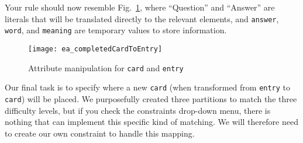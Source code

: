Your rule should now resemble Fig.~\ref{ea:cardtoentry_2}, where ``Question'' and ``Answer'' are literals that will be translated directly to the relevant
elements, and \texttt{answer}, \texttt{word}, and \texttt{meaning} are temporary values to store information.

\vspace{0.5cm}

\begin{figure}[htbp]
\begin{center}
  \texttt{[image: ea\_completedCardToEntry]}
  \caption{Attribute manipulation for \texttt{card} and \texttt{entry}}
  \label{ea:cardtoentry_2}
\end{center}
\end{figure}
\FloatBarrier


Our final task is to specify where a new \texttt{card} (when transformed from \texttt{entry} to \texttt{card}) will be placed.  We purposefully created three
partitions to match the three difficulty levels, but if you check the constraints drop-down menu, there is nothing that can implement this specific kind of
matching. We will therefore need to create our own constraint to handle this mapping.

